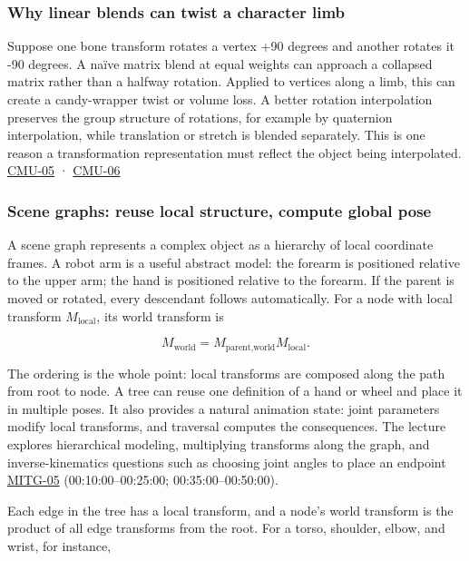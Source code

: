 \subsubsection{Why linear blends can twist a character limb}\label{why-linear-blends-can-twist-a-character-limb}

Suppose one bone transform rotates a vertex +90 degrees and another rotates it -90 degrees. A naïve matrix blend at equal weights can approach a collapsed matrix rather than a halfway rotation. Applied to vertices along a limb, this can create a candy-wrapper twist or volume loss. A better rotation interpolation preserves the group structure of rotations, for example by quaternion interpolation, while translation or stretch is blended separately. This is one reason a transformation representation must reflect the object being interpolated. \hyperref[04-visual-computing-ii-ch036]{CMU-05} · \hyperref[04-visual-computing-ii-ch036]{CMU-06}

\subsubsection{Scene graphs: reuse local structure, compute global pose}\label{scene-graphs-reuse-local-structure-compute-global-pose}

A scene graph represents a complex object as a hierarchy of local coordinate frames. A robot arm is a useful abstract model: the forearm is positioned relative to the upper arm; the hand is positioned relative to the forearm. If the parent is moved or rotated, every descendant follows automatically. For a node with local transform \(M_{\mathrm{local}}\), its world transform is

\[
M_{\text{world}}=M_{\text{parent,world}}M_{\text{local}}.
\]

The ordering is the whole point: local transforms are composed along the path from root to node. A tree can reuse one definition of a hand or wheel and place it in multiple poses. It also provides a natural animation state: joint parameters modify local transforms, and traversal computes the consequences. The lecture explores hierarchical modeling, multiplying transforms along the graph, and inverse-kinematics questions such as choosing joint angles to place an endpoint \hyperref[04-visual-computing-ii-ch036]{MITG-05} (00:10:00--00:25:00; 00:35:00--00:50:00).

Each edge in the tree has a local transform, and a node's world transform is the product of all edge transforms from the root. For a torso, shoulder, elbow, and wrist, for instance,

